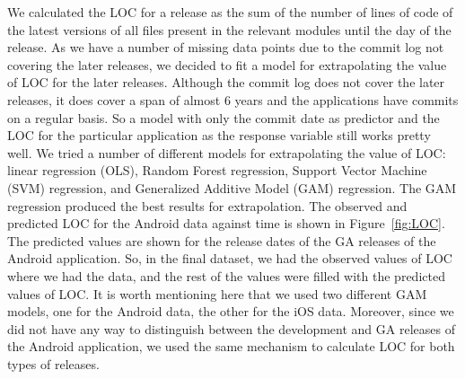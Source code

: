 \documentclass[smallcondensed]{svjour3}     %
\begin{document}
We calculated the LOC for a release as the sum of the number of lines of code of the latest versions of all files present in the relevant modules until the day of the release. As we have a number of missing data points due to the commit log not covering the later releases, we decided to fit a model for extrapolating the value of LOC for the later releases. Although the commit log does not cover the later releases, it does cover a span of almost 6 years and the applications have commits on a regular basis. So a model with only the commit date as predictor and the LOC for the particular application as the response variable still works pretty well. We tried a number of different models for extrapolating the value of LOC: linear regression (OLS), Random Forest regression, Support Vector Machine (SVM) regression, and Generalized Additive Model (GAM) regression. The GAM regression produced the best results for extrapolation. The observed and predicted LOC for the Android data against time is shown in Figure~\ref{fig:LOC}. The predicted values are shown for the release dates of the GA releases of the Android application. So, in the final dataset, we had the observed values of LOC where we had the data, and the rest of the values were filled with the predicted values of LOC. It is worth mentioning here that we used two different GAM models, one for the Android data, the other for the iOS data. Moreover, since we did not have any way to distinguish between the development and GA releases of the Android application, we used the same mechanism to calculate LOC for both types of releases.
\end{document}
